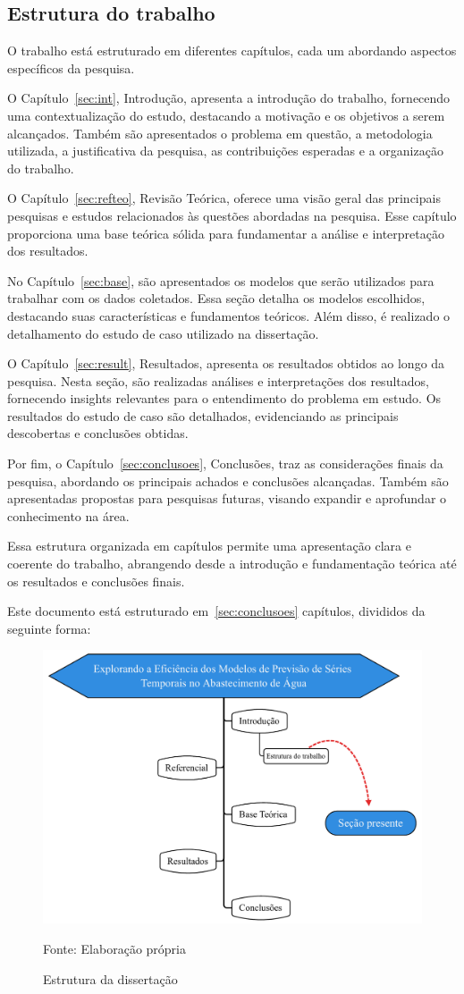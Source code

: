 \subsection{Estrutura do trabalho} \label{subsec:estrutura}



O trabalho está estruturado em diferentes capítulos, cada um abordando aspectos específicos da pesquisa. 

O Capítulo~\ref{sec:int}, Introdução, apresenta a introdução do trabalho, fornecendo uma contextualização do estudo, destacando a motivação e os objetivos a serem alcançados. Também são apresentados o problema em questão, a metodologia utilizada, a justificativa da pesquisa, as contribuições esperadas e a organização do trabalho.

O Capítulo~\ref{sec:refteo}, Revisão Teórica, oferece uma visão geral das principais pesquisas e estudos relacionados às questões abordadas na pesquisa. Esse capítulo proporciona uma base teórica sólida para fundamentar a análise e interpretação dos resultados.

No Capítulo~\ref{sec:base}, são apresentados os modelos que serão utilizados para trabalhar com os dados coletados. Essa seção detalha os modelos escolhidos, destacando suas características e fundamentos teóricos. Além disso, é realizado o detalhamento do estudo de caso utilizado na dissertação.

O Capítulo~\ref{sec:result}, Resultados, apresenta os resultados obtidos ao longo da pesquisa. Nesta seção, são realizadas análises e interpretações dos resultados, fornecendo insights relevantes para o entendimento do problema em estudo. Os resultados do estudo de caso são detalhados, evidenciando as principais descobertas e conclusões obtidas.

Por fim, o Capítulo~\ref{sec:conclusoes}, Conclusões, traz as considerações finais da pesquisa, abordando os principais achados e conclusões alcançadas. Também são apresentadas propostas para pesquisas futuras, visando expandir e aprofundar o conhecimento na área.

Essa estrutura organizada em capítulos permite uma apresentação clara e coerente do trabalho, abrangendo desde a introdução e fundamentação teórica até os resultados e conclusões finais.

 Este documento está estruturado em~\ref{sec:conclusoes} capítulos, divididos da seguinte forma:

\begin{figure}[H]
	\centering
	\caption{Estrutura da dissertação}
	\label{fig:estrutura}
	\includegraphics[width=0.9\linewidth]{Introducao/Figuras/Estrutura}
	
	Fonte: Elaboração própria 
\end{figure}
